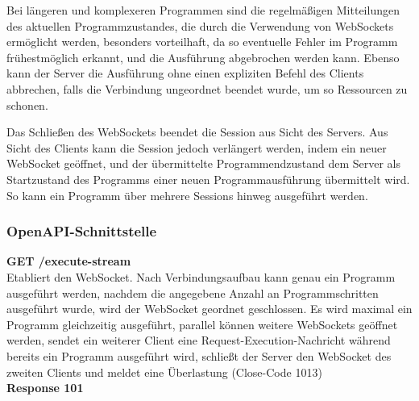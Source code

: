 {
}

Bei längeren und komplexeren Programmen sind die regelmäßigen Mitteilungen des aktuellen Programmzustandes,
die durch die Verwendung von WebSockets ermöglicht werden, besonders vorteilhaft,
da so eventuelle Fehler im Programm frühestmöglich erkannt, und die Ausführung abgebrochen werden kann.
Ebenso kann der Server die Ausführung ohne einen expliziten Befehl des Clients abbrechen,
falls die Verbindung ungeordnet beendet wurde, um so Ressourcen zu schonen.

Das Schließen des WebSockets beendet die Session aus Sicht des Servers.
Aus Sicht des Clients kann die Session jedoch verlängert werden, indem ein neuer WebSocket geöffnet, und der übermittelte Programmendzustand dem Server
als Startzustand des Programms einer neuen Programmausführung übermittelt wird.
So kann ein Programm über mehrere Sessions hinweg ausgeführt werden.

\subsubsection{OpenAPI-Schnittstelle}
\textbf{GET /execute-stream}\\
Etabliert den WebSocket.
Nach Verbindungsaufbau kann genau ein Programm ausgeführt werden, nachdem die angegebene Anzahl an Programmschritten
ausgeführt wurde, wird der WebSocket geordnet geschlossen.
Es wird maximal ein Programm gleichzeitig ausgeführt, parallel können weitere WebSockets geöffnet werden,
sendet ein weiterer Client eine Request-Execution-Nachricht während bereits ein Programm ausgeführt wird,
schließt der Server den WebSocket des zweiten Clients und meldet eine Überlastung (Close-Code 1013)\\
\textbf{Response 101}

